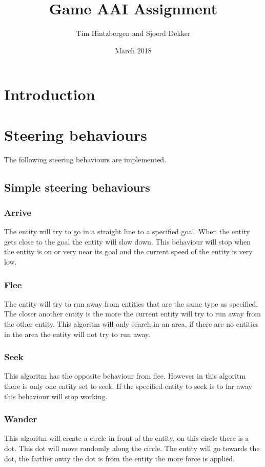 \documentclass{article}
\title{Game AAI Assignment}
\author{Tim Hintzbergen and Sjoerd Dekker}
\date{March 2018}
\begin{document}
   \maketitle
   \newpage
   
   \tableofcontents{}
   \newpage
   \section {Introduction}
   
   \newpage
   \section{Steering behaviours}
   The following steering behaviours are implemented. 
   \subsection{Simple steering behaviours}
   \subsubsection {Arrive}
   The entity will try to go in a straight line to a specified goal. When the entity gets close to the goal the entity will slow down. This behaviour will stop when the entity is on or very near its goal and the current speed of the entity is very low. 
   \subsubsection {Flee}
   The entity will try to run away from entities that are the same type as specified. The closer another entity is the more the current entity will try to run away from the other entity. This algoritm will only search in an area, if there are no entities in the area the entity will not try to run away.
   \subsubsection {Seek}
   This algoritm has the opposite behaviour from flee. However in this algoritm there is only one entity set to seek. If the specified entity to seek is to far away this behaviour will stop working.
   \subsubsection {Wander}
  This algoritm will create a circle in front of the entity, on this circle there is a dot. This dot will move randomly along the circle. The entity will go towards the dot, the farther away the dot is from the entity the more force is applied. 
\end{document}
